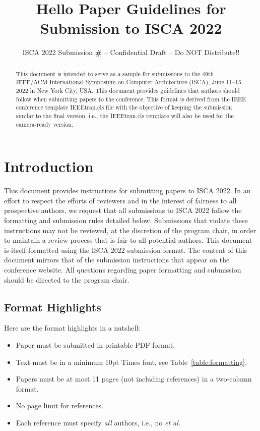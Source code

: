 \documentclass[conference]{IEEEtran}
\title{Hello Paper Guidelines for Submission to ISCA 2022}
\author{\normalsize{ISCA 2022 Submission
    \textbf{\#\iscasubmissionnumber} -- Confidential Draft -- Do NOT Distribute!!}}
\begin{document}
\maketitle
\thispagestyle{plain}
\pagestyle{plain}




\begin{abstract}

This document is intended to serve as a sample for submissions to the
49th IEEE/ACM International Symposium on Computer Architecture (ISCA),
June 11--15, 2022 in New York City, USA. This document provides
guidelines that authors should follow when submitting papers to the
conference. This format is derived from the IEEE conference template IEEEtran.cls
file with the objective of keeping the submission similar to the final
version, i.e., the IEEEtran.cls template will also be used for
the camera-ready version.

\end{abstract}

\section{Introduction}

This document provides instructions for submitting papers to ISCA
2022. In an effort to respect the efforts of reviewers and in the
interest of fairness to all prospective authors, we request that all
submissions to ISCA 2022 follow the formatting and submission rules
detailed below. Submissions that violate these instructions may not be
reviewed, at the discretion of the program chair, in order to
maintain a review process that is fair to all potential authors. This
document is itself formatted using the ISCA 2022 submission format. The
content of this document mirrors that of the submission instructions
that appear on the conference website. All questions regarding paper
formatting and submission should be directed to the program chair.

\subsection{Format Highlights}

Here are the format highlights in a nutshell:
\begin{itemize}
\item Paper must be submitted in printable PDF format.
\item Text must be in a minimum 10pt Times font, see Table~\ref{table:formatting}.
\item Papers must be at most 11 pages (not including references) in a
  two-column format.
\item No page limit for references.
\item Each reference must specify {\em all} authors, i.e., no {\em et al.}
\end{itemize}
\end{document}

